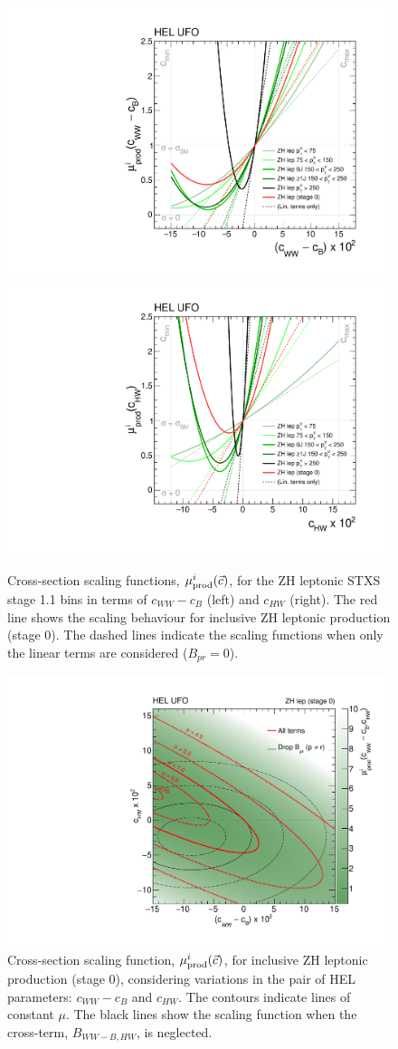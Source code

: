 \begin{figure}
  \centering
  \includegraphics[width=.48\textwidth]{Figures/eft/scaling_functions/ZH_lep_vs_cWWMinuscB.pdf}
  \includegraphics[width=.48\textwidth]{Figures/eft/scaling_functions/ZH_lep_vs_cHW.pdf}
  \caption[HEL cross-section scaling functions for ZH leptonic STXS bins]
  {
    Cross-section scaling functions, $\mu_{\rm{prod}}^i(\vec{c})$, for the ZH leptonic STXS stage 1.1 bins in terms of $c_{WW}-c_B$ (left) and $c_{HW}$ (right). The red line shows the scaling behaviour for inclusive ZH leptonic production (stage 0). The dashed lines indicate the scaling functions when only the linear terms are considered ($B_{pr}=0$).
  }
  \label{fig:zhlep_sf_1d}
\end{figure}

\begin{figure}[t]
  \centering
  \includegraphics[width=.7\textwidth]{Figures/eft/scaling_functions/ZH_lep_cWWMinuscB_vs_cHW.pdf}
  \caption[Two-dimensional HEL cross-section scaling function for ZH leptonic STXS stage 0 bin]
  {
    Cross-section scaling function, $\mu_{\rm{prod}}^i(\vec{c})$, for inclusive ZH leptonic production (stage 0), considering variations in the pair of HEL parameters: $c_{WW}-c_B$ and $c_{HW}$. The contours indicate lines of constant $\mu$. The black lines show the scaling function when the cross-term, $B_{WW-B,HW}$, is neglected.
  }
  \label{fig:zhlep_sf_2d}
\end{figure}

